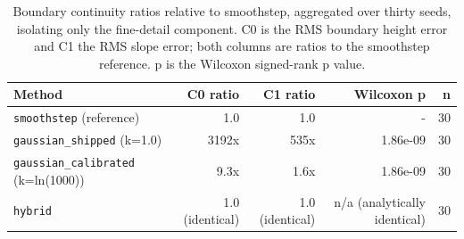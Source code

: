 \begin{table}[htb]
\centering
\caption{Boundary continuity ratios relative to smoothstep, aggregated over thirty seeds, isolating only the fine-detail component. C0 is the RMS boundary height error and C1 the RMS slope error; both columns are ratios to the smoothstep reference. p is the Wilcoxon signed-rank p value.}
\label{tab:continuity}
\footnotesize
\setlength{\tabcolsep}{4pt}
\begin{tabular}{@{}lrrrr@{}}
\toprule
Method & C0 ratio & C1 ratio & Wilcoxon p & n \\
\midrule
\texttt{smoothstep} (reference) & 1.0 & 1.0 & - & 30 \\
\texttt{gaussian\_shipped} (k=1.0) & 3192x & 535x & 1.86e-09 & 30 \\
\texttt{gaussian\_calibrated} (k=ln(1000)) & 9.3x & 1.6x & 1.86e-09 & 30 \\
\texttt{hybrid} & 1.0 (identical) & 1.0 (identical) & n/a (analytically identical) & 30 \\
\bottomrule
\end{tabular}
\end{table}
